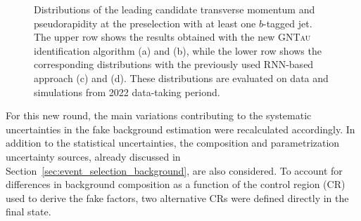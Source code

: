 \begin{figure}[htbp]
    \caption{Distributions of the leading \tauhad candidate transverse momentum and pseudorapidity at the \ttH preselection with at least one $b$-tagged jet. 
    The upper row shows the results obtained with the new \textsc{GNTau} identification algorithm (a) and (b), while the lower row shows the corresponding distributions with the previously used RNN-based approach (c) and (d). These distributions are evaluated on data and simulations from 2022 data-taking periond.}
    \label{run2_fakes_comparison}
\end{figure}

For this new round, the main variations contributing to the systematic uncertainties in the fake background estimation were recalculated accordingly. In addition to the statistical uncertainties, the composition and parametrization uncertainty sources, already discussed in Section~\ref{sec:event_selection_background}, are also considered.  
To account for differences in background composition as a function of the control region (CR) used to derive the fake factors, two alternative CRs were defined directly in the \tauhadhad final state.  

